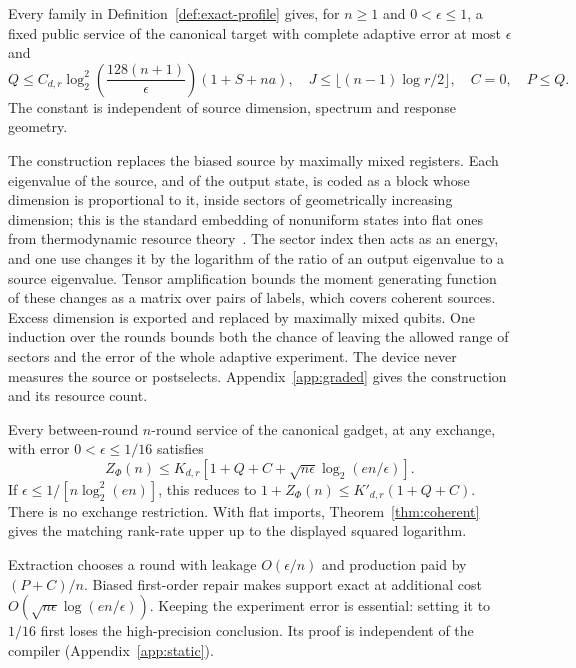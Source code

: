 \begin{theorem}\label{thm:coherent}
Every family in Definition~\ref{def:exact-profile} gives, for $n\ge1$ and $0<\epsilon\le1$, a fixed public service
of the canonical target with complete adaptive error at most $\epsilon$ and
\[
 Q\le C_{d,r}\log_2^2\!\left(\frac{128(n+1)}\epsilon\right)(1+S+n a),\quad
 J\le\lfloor(n-1)\log r/2\rfloor,\quad C=0,\quad P\le Q.
\]
The constant is independent of source dimension, spectrum and response geometry.
\end{theorem}

The construction replaces the biased source by maximally mixed registers. Each eigenvalue of the source, and
of the output state, is coded as a block whose dimension is proportional to it, inside sectors of geometrically
increasing dimension; this is the standard embedding of nonuniform states into flat ones from thermodynamic
resource theory~\cite{HorodeckiOppenheim2013}. The sector index then acts as an energy, and one use changes it by the logarithm of the
ratio of an output eigenvalue to a source eigenvalue. Tensor amplification bounds the moment generating function
of these changes as a matrix over pairs of labels, which covers coherent sources. Excess dimension is exported and
replaced by maximally mixed qubits. One induction over the rounds bounds both the chance of leaving the allowed
range of sectors and the error of the whole adaptive experiment. The device never measures the source or
postselects. Appendix~\ref{app:graded} gives the construction and its resource count.

\begin{theorem}\label{thm:Z-necessary}
Every between-round $n$-round service of the canonical gadget, at any exchange, with error $0<\epsilon\le1/16$ satisfies
\[
 Z_\Phi(n)\le K_{d,r}\left[1+Q+C+\sqrt{n\epsilon}\log_2(en/\epsilon)\right].
\]
If $\epsilon\le1/[n\log_2^2(en)]$, this reduces to $1+Z_\Phi(n)\le K'_{d,r}(1+Q+C)$.
There is no exchange restriction. With flat imports, Theorem~\ref{thm:coherent} gives the matching rank-rate
upper up to the displayed squared logarithm.
\end{theorem}

Extraction chooses a round with leakage $O(\epsilon/n)$ and production paid by $(P+C)/n$.
Biased first-order repair makes support exact at additional cost
$O(\sqrt{n\epsilon}\log(en/\epsilon))$.
Keeping the experiment error is essential: setting it to $1/16$ first loses the high-precision conclusion.
Its proof is independent of the compiler (Appendix~\ref{app:static}).


